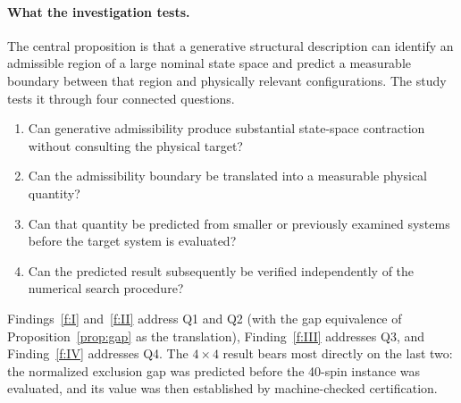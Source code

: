 \documentclass[11pt,a4paper]{article}
\theoremstyle{plain}
\theoremstyle{definition}
\theoremstyle{remark}
\begin{document}
\paragraph{What the investigation tests.} The central proposition is that a generative structural description can identify an admissible region of a large nominal state space and predict a measurable boundary between that region and physically relevant configurations. The study tests it through four connected questions.
\begin{enumerate}[label=\textbf{Q\arabic*.},leftmargin=2.4em,itemsep=0.1em]
\item Can generative admissibility produce substantial state-space contraction without consulting the physical target?
\item Can the admissibility boundary be translated into a measurable physical quantity?
\item Can that quantity be predicted from smaller or previously examined systems before the target system is evaluated?
\item Can the predicted result subsequently be verified independently of the numerical search procedure?
\end{enumerate}
Findings~\ref{f:I} and~\ref{f:II} address Q1 and Q2 (with the gap equivalence of Proposition~\ref{prop:gap} as the translation), Finding~\ref{f:III} addresses Q3, and Finding~\ref{f:IV} addresses Q4. The $4\times4$ result bears most directly on the last two: the normalized exclusion gap was predicted before the 40-spin instance was evaluated, and its value was then established by machine-checked certification.
\end{document}

